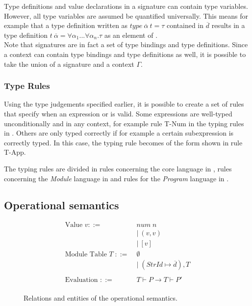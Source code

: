 Type definitions and value declarations in a signature can contain type variables.
However, all type variables are assumed be quantified universally.
This means for example that a type definition written as $type\ \overline{\alpha}\ t = \tau$ contained in $\overline{d}$ results in a type definition $t\ \overline{\alpha} = \forall \alpha_{1}...\forall \alpha_{n}.\tau$ as an element of .
\\[1em]
Note that signatures are in fact a set of type bindings and type definitions.
Since a context can contain type bindings and type definitions as well, it is possible to take the union of a signature and a context $\Gamma$.


\subsubsection{Type Rules}
Using the type judgements specified earlier, it is possible to create a set of rules that specify when an expression  or  is valid.
Some expressions are well-typed unconditionally and in any context, for example rule T-Num in the typing rules in .
Others are only typed correctly if for example a certain subexpression is correctly typed. In this case, the typing rule becomes of the form shown in rule T-App.

The typing rules are divided in rules concerning the core language in , rules concerning the \emph{Module} language in  and rules for the \emph{Program} language in .


\clearpage
\subsection{Operational semantics}
\label{sec:MLOperationalSemantics}
\begin{figure}[htb]
\begin{align*}
\text{Value }v ::=\;&\mathit{num\;n} \\ %
&|\ (v,v) \\
&|\ [v]
\\
\text{Module Table } T\; ::= \;&\emptyset \\
&| \; (\mathit{StrId} \mapsto %
\overline{d}
), T \\
\\
\text{Evaluation } ::= & T \vdash P \rightarrow T \vdash P' \\
\end{align*}
\caption[Operational Semantic Entities]{Relations and entities of the operational semantics.\label{fig:MiniMLOperationalSemanticEntitiesAndRelations}}
\end{figure}

